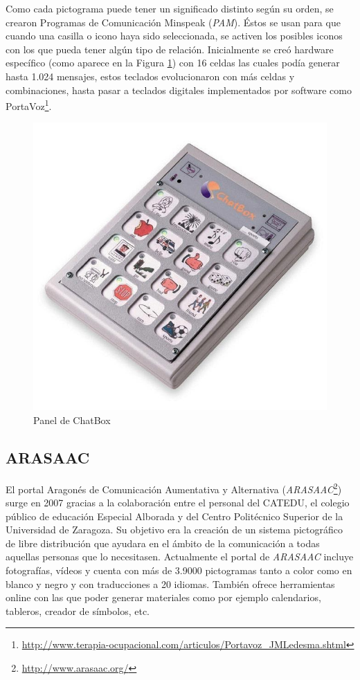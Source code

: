 Como cada pictograma puede tener un significado distinto según su orden, se crearon Programas de Comunicación Minspeak (\textit{PAM}). Éstos se usan para que cuando una casilla o icono haya sido seleccionada, se activen los posibles iconos con los que pueda tener algún tipo de relación. Inicialmente se creó hardware específico (como aparece en la Figura \ref{fig:chatbox}) con 16 celdas las cuales podía generar hasta 1.024 mensajes, estos teclados evolucionaron con más celdas y combinaciones, hasta pasar a teclados digitales implementados por software como PortaVoz\footnote{\url{http://www.terapia-ocupacional.com/articulos/Portavoz_JMLedesma.shtml}}.

\begin{figure}[h!]
	\centering
	\includegraphics[width=0.4\linewidth]{Imagenes/Bitmap/ChatBox}
	\caption[ChatBox]{Panel de ChatBox}
	\label{fig:chatbox}
\end{figure}



\subsection{ARASAAC}

El portal Aragonés de Comunicación Aumentativa y Alternativa  (\textit{ARASAAC}\footnote{\url{http://www.arasaac.org/}})
 surge en 2007 gracias a la colaboración entre el personal del CATEDU, el colegio público de educación Especial Alborada y del Centro Politécnico Superior de la Universidad de Zaragoza. Su objetivo era la creación de un sistema pictográfico de libre distribución que ayudara en el ámbito de la comunicación a todas aquellas personas que lo necesitasen.
Actualmente el portal de \textit{ARASAAC} incluye fotografías, vídeos y cuenta con más de 3.9000 pictogramas tanto a color como en blanco y negro y con traducciones a 20 idiomas. También ofrece herramientas online con las que poder generar materiales como por ejemplo calendarios, tableros, creador de símbolos, etc.

